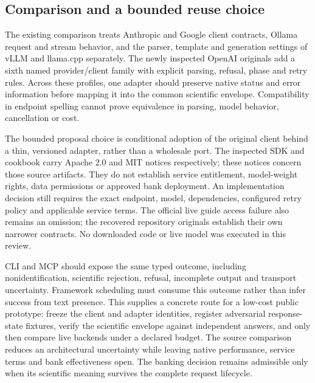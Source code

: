 \subsection{Comparison and a bounded reuse choice}
The existing comparison treats Anthropic and Google client contracts, Ollama request and stream behavior,
and the parser, template and generation settings of vLLM and llama.cpp separately. The newly inspected OpenAI
originals add a sixth named provider/client family with explicit parsing, refusal, phase and retry rules.
Across these profiles, one adapter should preserve native status and error information before mapping it into
the common scientific envelope. Compatibility in endpoint spelling cannot prove equivalence in parsing,
model behavior, cancellation or cost.~\citep{exec24_backend_anthropic,exec24_backend_google,exec24_backend_ollama,exec24_backend_vllm,exec24_backend_llamacpp,exec28_oa_sdk}

The bounded proposal choice is conditional adoption of the original client behind a thin, versioned adapter,
rather than a wholesale port. The inspected SDK and cookbook carry Apache 2.0 and MIT notices respectively;
these notices concern those source artifacts. They do not establish service entitlement, model-weight rights,
data permissions or approved bank deployment. An implementation decision still requires the exact endpoint,
model, dependencies, configured retry policy and applicable service terms. The official live guide access
failure also remains an omission; the recovered repository originals establish their own narrower contracts.
No downloaded code or live model was executed in this review.~\citep{exec28_oa_sdk,exec28_oa_cookbook}

CLI and MCP should expose the same typed outcome, including nonidentification, scientific rejection, refusal,
incomplete output and transport uncertainty. Framework scheduling must consume this outcome rather than infer
success from text presence. This supplies a concrete route for a low-cost public prototype: freeze the client
and adapter identities, register adversarial response-state fixtures, verify the scientific envelope against
independent answers, and only then compare live backends under a declared budget. The source comparison reduces
an architectural uncertainty while leaving native performance, service terms and bank effectiveness open.
The banking decision remains admissible only when its scientific meaning survives the complete request lifecycle.


